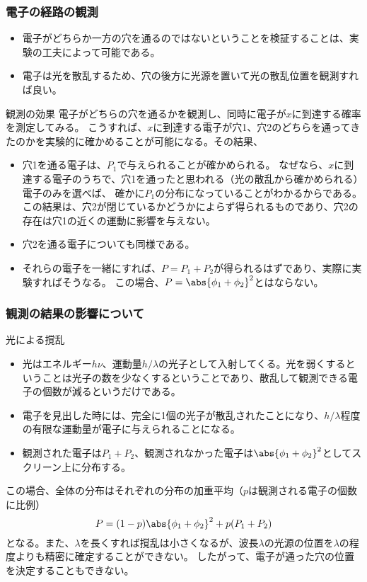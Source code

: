 \documentclass[11pt,aspectratio=169,xcolor=dvipsnames,table,dvipdfmx]{beamer}
\begin{document}
\begin{frame}
  \frametitle{電子の経路の観測}
  \begin{itemize}
    \item 電子がどちらか一方の穴を通るのではないということを検証することは、実験の工夫によって可能である。
    \item 電子は光を散乱するため、穴の後方に光源を置いて光の散乱位置を観測すれば良い。
  \end{itemize}
  \begin{block}{観測の効果}
    電子がどちらの穴を通るかを観測し、同時に電子が$x$に到達する確率を測定してみる。
    こうすれば、$x$に到達する電子が穴1、穴2のどちらを通ってきたのかを実験的に確かめることが可能になる。その結果、
    \begin{itemize}
      \item 穴1を通る電子は、$P_1$で与えられることが確かめられる。
      なぜなら、$x$に到達する電子のうちで、穴1を通ったと思われる（光の散乱から確かめられる）電子のみを選べば、
      確かに$P_1$の分布になっていることがわかるからである。この結果は、穴2が閉じているかどうかによらず得られるものであり、穴2の存在は穴1の近くの運動に影響を与えない。
      \item 穴2を通る電子についても同様である。
      \item それらの電子を一緒にすれば、$P=P_1+P_2$が得られるはずであり、実際に実験すればそうなる。
      この場合、$P = \abs{\phi_1+\phi_2}^2$とはならない。
    \end{itemize}
  \end{block}
\end{frame}

\begin{frame}
  \frametitle{観測の結果の影響について}
  \begin{block}{光による撹乱}
    \begin{itemize}
      \item 光はエネルギー$h\nu$、運動量$h/\lambda$の光子として入射してくる。光を弱くするということは光子の数を少なくするということであり、散乱して観測できる電子の個数が減るというだけである。
      \item 電子を見出した時には、完全に1個の光子が散乱されたことになり、$h/\lambda$程度の有限な運動量が電子に与えられることになる。
      \item 観測された電子は$P_1+P_2$、観測されなかった電子は$\abs{\phi_1+\phi_2}^2$としてスクリーン上に分布する。
    \end{itemize}
    この場合、全体の分布はそれぞれの分布の加重平均（$p$は観測される電子の個数に比例）
    \begin{equation}
      P = (1-p)\abs{\phi_1+\phi_2}^2 + p(P_1+P_2)
    \end{equation}
    となる。また、$\lambda$を長くすれば撹乱は小さくなるが、波長$\lambda$の光源の位置を$\lambda$の程度よりも精密に確定することができない。
    したがって、電子が通った穴の位置を決定することもできない。
  \end{block}
\end{frame}
\end{document}

